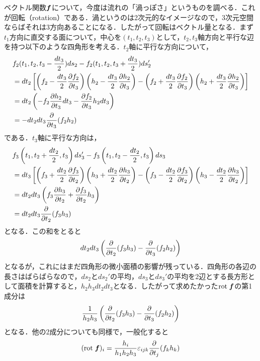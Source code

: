 \documentclass[a4paper,10pt,uplatex]{jsarticle}
\newcommand{\rot}{\mathrm{rot}\;}
\begin{document}
ベクトル関数$\vb*{f}$について，今度は流れの「渦っぽさ」というものを調べる．これが回転（rotation）である．渦というのは2次元的なイメージなので，3次元空間ならばそれは3方向あることになる．したがって回転はベクトル量となる．まず$t_1$方向に直交する面について，中心を$(t_1,t_2,t_3)$として，$t_2, t_3$軸方向と平行な辺を持つ以下のような四角形を考える．$t_2$軸に平行な方向について，
\begin{align}
    &f_2(t_1,t_2,t_3-\frac{dt_3}{2})ds_2 - f_2(t_1,t_2,t_3+\frac{dt_3}{2})ds_2'  \\
    &= dt_2\left[\left(f_2 - \frac{dt_3}{2}\pdv{f_2}{t_3}\right)\left(h_2 - \frac{dt_3}{2}\pdv{h_2}{t_3}\right) - \left(f_2 + \frac{dt_3}{2}\pdv{f_2}{t_3}\right)\left(h_2 + \frac{dt_3}{2}\pdv{h_2}{t_3}\right)\right] \\
    &= dt_2\left(-f_2\pdv{h_2}{t_3}dt_3 - \pdv{f_2}{t_3}h_2 dt_3\right) \\
    &= -dt_2dt_3\pdv{t_3}(f_2h_2)
\end{align}
である．$t_3$軸に平行な方向は，
\begin{align}
    &f_3\left(t_1,t_2+\frac{dt_2}{2},t_3\right)ds_3' - f_3\left(t_1,t_2-\frac{dt_2}{2},t_3\right)ds_3 \\
    &= dt_3\left[\left(f_3 + \frac{dt_2}{2}\pdv{f_3}{t_2}\right)\left(h_3+\frac{dt_2}{2}\pdv{h_3}{t_2}\right) - \left(f_3 - \frac{dt_2}{2}\pdv{f_3}{t_2}\right)\left(h_3-\frac{dt_2}{2}\pdv{h_3}{t_2}\right)\right] \\
    &= dt_2dt_3\left(f_3\pdv{h_3}{t_2} + \pdv{f_3}{t_2}h_3\right) \\
    &= dt_2dt_3\pdv{t_2}(f_3h_3)
\end{align}
となる．この和をとると
\begin{equation}
    dt_2dt_3\left(\pdv{t_2}(f_3h_3) - \pdv{t_3}(f_2h_2)\right)
\end{equation}
となるが，これにはまだ四角形の微小面積の影響が残っている．四角形の各辺の長さはばらばらなので，$ds_2$と$ds_2'$の平均，$ds_3$と$ds_3'$の平均を2辺とする長方形として面積を計算すると，$h_2h_3dt_2dt_3$となる．したがって求めたかった$\rot \vb*{f}$の第1成分は
\begin{equation}
    \frac{1}{h_2h_3}\left(\pdv{t_2}(f_3h_3) - \pdv{t_3}(f_2h_2)\right)
\end{equation}
となる．他の2成分についても同様で，一般化すると
\begin{equation}
    (\rot \vb*{f})_i = \frac{h_i}{h_1h_2h_3}\varepsilon_{ijk}\pdv{t_j}(f_kh_k)
\end{equation}
\end{document}
